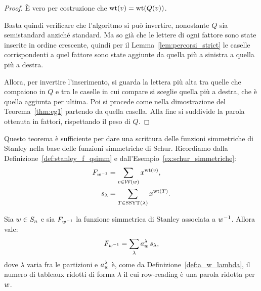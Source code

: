 \begin{proof}
    \`E vero per costruzione che $\operatorname{wt}(v) = \operatorname{wt}(Q(v))$.

    Basta quindi verificare che l'algoritmo si pu\`o invertire, nonostante 
    $Q$ sia semistandard anzich\'e standard.
    Ma so gi\`a che le lettere di ogni fattore sono state inserite in ordine 
    crescente, quindi per il Lemma~\ref{lem:percorsi_strict} le caselle corrispondenti
    a quel fattore sono state aggiunte da quella pi\`u a sinistra a quella pi\`u a destra.
    
    Allora, per invertire l'inserimento, si guarda la lettera pi\`u alta tra quelle che compaiono
    in $Q$ e tra le caselle in cui compare si sceglie quella pi\`u a destra, 
    che \`e quella aggiunta per ultima.
    Poi si procede come nella dimostrazione del Teorema~\ref{thm:eg1}
    partendo da quella casella.
    Alla fine si suddivide la parola ottenuta in fattori, rispettando il peso di $Q$.
\end{proof}


Questo teorema \`e sufficiente per dare una scrittura delle funzioni simmetriche
di Stanley nella base delle funzioni simmetriche di Schur.
Ricordiamo dalla Definizione~\ref{def:stanley_f_qsimm} e 
dall'Esempio~\ref{ex:schur_simmetriche}:
\begin{align*}
    F_{w^{-1}} &= \sum_{ v \in \operatorname{\mathcal{W}}(w) } x^{\operatorname{wt}(v)}, \\
    s_\lambda &= \sum_{ T \in \operatorname{SSYT}(\lambda) } x^{\operatorname{wt}(T)}.
\end{align*}

\begin{corollary}
    Sia $w \in S_n$ e sia $F_{w^{-1}}$ la funzione simmetrica di Stanley associata
    a $w^{-1}$.
    Allora vale:
    \begin{equation}
        \label{eq:stan_in_schur}
        F_{w^{-1}} = \sum_{\lambda} a_w^\lambda \, s_\lambda,
    \end{equation}
    dove $\lambda$ varia fra le partizioni e $a_w^\lambda$ \`e,
    come da Definizione~\ref{def:a_w_lambda}, il numero
    di tableaux ridotti di forma $\lambda$ il cui row-reading
    \`e una parola ridotta per $w$.
\end{corollary}


